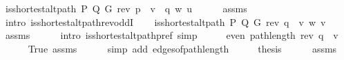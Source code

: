 \begin{isabellebody}
\ {\isachardoublequoteopen}is{\isacharunderscore}{\kern0pt}shortest{\isacharunderscore}{\kern0pt}alt{\isacharunderscore}{\kern0pt}path\ P\ Q\ G\ {\isacharparenleft}{\kern0pt}rev\ {\isacharparenleft}{\kern0pt}p\ {\isacharat}{\kern0pt}\ v\ {\isacharhash}{\kern0pt}\ q{\isacharparenright}{\kern0pt}{\isacharparenright}{\kern0pt}\ w\ u{\isachardoublequoteclose}\isanewline
\ \ \ \ \isamarkupfalse%
\ assms{\isacharparenleft}{\kern0pt}{}{\isacharcomma}{\kern0pt}\ {}{\isacharparenright}{\kern0pt}\isanewline
\ \ \ \ \isamarkupfalse%
\ {\isacharparenleft}{\kern0pt}intro\ is{\isacharunderscore}{\kern0pt}shortest{\isacharunderscore}{\kern0pt}alt{\isacharunderscore}{\kern0pt}path{\isacharunderscore}{\kern0pt}rev{\isacharunderscore}{\kern0pt}oddI{\isacharparenright}{\kern0pt}\isanewline
\ \ \isamarkupfalse%
\ {\isachardoublequoteopen}is{\isacharunderscore}{\kern0pt}shortest{\isacharunderscore}{\kern0pt}alt{\isacharunderscore}{\kern0pt}path\ P\ Q\ G\ {\isacharparenleft}{\kern0pt}rev\ q\ {\isacharat}{\kern0pt}\ {\isacharbrackleft}{\kern0pt}v{\isacharbrackright}{\kern0pt}{\isacharparenright}{\kern0pt}\ w\ v{\isachardoublequoteclose}\isanewline
\ \ \ \ \isamarkupfalse%
\ assms{\isacharparenleft}{\kern0pt}{}{\isacharparenright}{\kern0pt}\isanewline
\ \ \ \ \isamarkupfalse%
\ {\isacharparenleft}{\kern0pt}intro\ is{\isacharunderscore}{\kern0pt}shortest{\isacharunderscore}{\kern0pt}alt{\isacharunderscore}{\kern0pt}path{\isacharunderscore}{\kern0pt}pref{\isacharparenright}{\kern0pt}\ simp\isanewline
\ \ \isamarkupfalse%
\ \isamarkupfalse%
\ {\isachardoublequoteopen}even\ {\isacharparenleft}{\kern0pt}path{\isacharunderscore}{\kern0pt}length\ {\isacharparenleft}{\kern0pt}rev\ q\ {\isacharat}{\kern0pt}\ {\isacharbrackleft}{\kern0pt}v{\isacharbrackright}{\kern0pt}{\isacharparenright}{\kern0pt}{\isacharparenright}{\kern0pt}{\isachardoublequoteclose}\isanewline
\ \ \ \ \isamarkupfalse%
\ True\ assms{\isacharparenleft}{\kern0pt}{}{\isacharparenright}{\kern0pt}\isanewline
\ \ \ \ \isamarkupfalse%
\ {\isacharparenleft}{\kern0pt}simp\ add{\isacharcolon}{\kern0pt}\ edges{\isacharunderscore}{\kern0pt}of{\isacharunderscore}{\kern0pt}path{\isacharunderscore}{\kern0pt}length{\isacharparenright}{\kern0pt}\isanewline
\ \ \isamarkupfalse%
\ \isamarkupfalse%
\ {\isacharquery}{\kern0pt}thesis\isanewline
\ \ \ \ \isamarkupfalse%
\ assms{\isacharparenleft}{\kern0pt}{}{\isacharparenright}{\kern0pt}\isanewline

\end{isabellebody}

